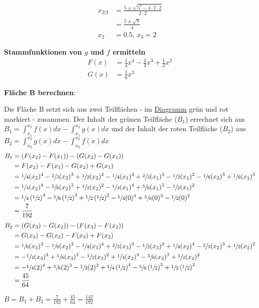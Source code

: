 \documentclass{article}
\begin{document}
\begin{align*}
  x_{2|3} &= \frac{5 \pm \sqrt{5^2 - 4 \cdot 2 \cdot 2}}{2 \cdot 2} \\
          &= \frac{5 \pm \sqrt{9}}{4} \\
  x_2 &= 0.5, \, x_3 = 2 
\end{align*}

\textbf{Stammfunktionen von $g$ und $f$ ermitteln}
\begin{align*}
  F(x) &= \frac{1}{4}x^4 - \frac{2}{3}x^3 + \frac{1}{2}x^2 \\
  G(x) &= \frac{1}{6}x^3 
\end{align*}

\newpage
\textbf{Fläche B berechnen}:

Die Fläche B setzt sich aus zwei Teilflächen - im \hyperref[dia:4]{Diagramm}
grün und rot markiert - zusammen.
Der Inhalt der grünen Teilfläche ($B_1$) errechnet sich aus
$B_1 = \int_{x_1}^{x_2} f(x) dx - \int_{x_1}^{x_2} g(x) dx$ und der Inhalt der roten
Teilfläche ($B_2$) aus
$B_2 = \int_{x_2}^{x_3} g(x) dx - \int_{x_2}^{x_3} f(x) dx$
\begin{align*}
  B_1 &= \left( F(x_2) - F(x_1) \right) - \left( G(x_2) - G(x_1) \right) \\
      &= F(x_2) - F(x_1) - G(x_2) + G(x_1) \\
      &= \sfrac{1}{4}(x_2)^4 - \sfrac{2}{3}(x_2)^3 + \sfrac{1}{2}(x_2)^2 - \sfrac{1}{4}(x_1)^4 + \sfrac{2}{3}(x_1)^3 - \sfrac{1}{2}(x_1)^2 -
        \sfrac{1}{6}(x_2)^3 + \sfrac{1}{6}(x_1)^3 \\
      &= \sfrac{1}{4}(x_2)^4 - \sfrac{5}{6}(x_2)^3 + \sfrac{1}{2}(x_2)^2 - \sfrac{1}{4}(x_1)^4 + \sfrac{5}{6}(x_1)^3 - \sfrac{1}{2}(x_1)^2 \\
      &= \sfrac{1}{4}\left(\sfrac{1}{2}\right)^4 - \sfrac{5}{6}\left(\sfrac{1}{2}\right)^3 + \sfrac{1}{2}\left(\sfrac{1}{2}\right)^2 -
        \sfrac{1}{4}(0)^4 + \sfrac{5}{6}(0)^3 - \sfrac{1}{2}(0)^2 \\
      &= \frac{7}{192}
\end{align*}
\begin{align*}
  B_2 &=\left( G(x_3) - G(x_2) \right) - \left( F(x_3) - F(x_2) \right) \\
      &= G(x_3) - G(x_2) - F(x_3) + F(x_2) \\
      &= \sfrac{1}{6}(x_3)^3 - \sfrac{1}{6}(x_2)^3 - \sfrac{1}{4}(x_3)^4 + \sfrac{2}{3}(x_3)^3 - \sfrac{1}{2}(x_3)^2 +
        \sfrac{1}{4}(x_2)^4 - \sfrac{2}{3}(x_2)^3 + \sfrac{1}{2}(x_2)^2 \\
      &= - \sfrac{1}{4}(x_3)^4 + \sfrac{5}{6}(x_3)^3 - \sfrac{1}{2}(x_3)^2 +
        \sfrac{1}{4}(x_2)^4 - \sfrac{5}{6}(x_2)^3 + \sfrac{1}{2}(x_2)^2 \\
      &= - \sfrac{1}{4}(2)^4 + \sfrac{5}{6}(2)^3 - \sfrac{1}{2}(2)^2 + \sfrac{1}{4}\left(\sfrac{1}{2}\right)^4 -
        \sfrac{5}{6}\left(\sfrac{1}{2}\right)^3 + \sfrac{1}{2}\left(\sfrac{1}{2}\right)^2 \\
      &= \frac{45}{64}
\end{align*}

$B = B_1 + B_2 = \frac{7}{192} + \frac{45}{64} = \frac{142}{192}$
\end{document}
